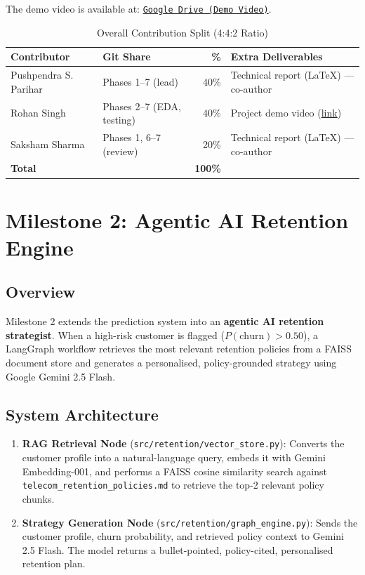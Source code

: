 \documentclass[12pt,a4paper]{article}
\begin{document}
The demo video is available at: \href{https://drive.google.com/file/d/1u08SJbGc92HiiyLoe42iHyELQlHl03aQ/view?usp=sharing}{\texttt{Google Drive (Demo Video)}}.

\begin{table}[H]
\centering
\caption{Overall Contribution Split (4:4:2 Ratio)}
\begin{tabular}{llrp{6cm}}
    \toprule
    \textbf{Contributor} & \textbf{Git Share} & \textbf{\%} & \textbf{Extra Deliverables} \\
    \midrule
    Pushpendra S. Parihar & Phases 1--7 (lead) & 40\% & Technical report (LaTeX) --- co-author \\
    Rohan Singh           & Phases 2--7 (EDA, testing) & 40\% & Project demo video (\href{https://drive.google.com/file/d/1u08SJbGc92HiiyLoe42iHyELQlHl03aQ/view?usp=sharing}{link}) \\
    Saksham Sharma        & Phases 1, 6--7 (review) & 20\% & Technical report (LaTeX) --- co-author \\
    \midrule
    \textbf{Total} & & \textbf{100\%} & \\
    \bottomrule
\end{tabular}
\end{table}

\section{Milestone 2: Agentic AI Retention Engine}

\subsection{Overview}

Milestone 2 extends the prediction system into an \textbf{agentic AI retention strategist}. When a high-risk customer is flagged ($P(\text{churn}) > 0.50$), a LangGraph workflow retrieves the most relevant retention policies from a FAISS document store and generates a personalised, policy-grounded strategy using Google Gemini 2.5 Flash.

\subsection{System Architecture}

\begin{enumerate}[leftmargin=2em]
    \item \textbf{RAG Retrieval Node} (\texttt{src/retention/vector\_store.py}): Converts the customer profile into a natural-language query, embeds it with Gemini Embedding-001, and performs a FAISS cosine similarity search against \texttt{telecom\_retention\_policies.md} to retrieve the top-2 relevant policy chunks.
    \item \textbf{Strategy Generation Node} (\texttt{src/retention/graph\_engine.py}): Sends the customer profile, churn probability, and retrieved policy context to Gemini 2.5 Flash. The model returns a bullet-pointed, policy-cited, personalised retention plan.
\end{enumerate}
\end{document}

